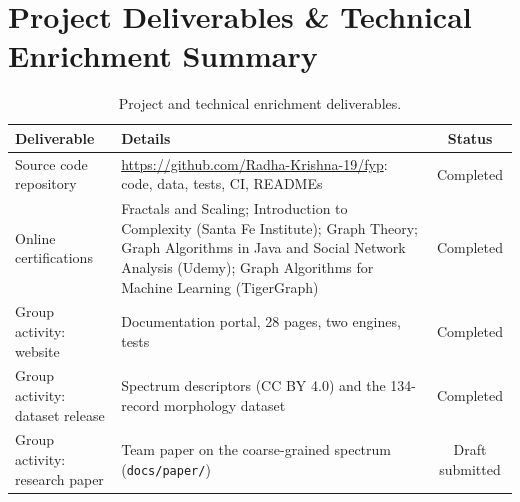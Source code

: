\documentclass[11pt, a4paper]{article}
\begin{document}
\section{Project Deliverables \& Technical Enrichment Summary}
\begin{table}[H]
    \centering
    \footnotesize
    \renewcommand{\arraystretch}{1.15}
    \begin{tabular}{|p{4.0cm}|p{9.2cm}|c|}
        \hline
        \textbf{Deliverable} & \textbf{Details} & \textbf{Status} \\
        \hline
        Source code repository & \url{https://github.com/Radha-Krishna-19/fyp}: code, data, tests, CI, READMEs & Completed \\
        \hline
        Online certifications & Fractals and Scaling; Introduction to Complexity (Santa Fe Institute); Graph Theory; Graph Algorithms in Java and Social Network Analysis (Udemy); Graph Algorithms for Machine Learning (TigerGraph) & Completed \\
        \hline
        Group activity: website & Documentation portal, 28 pages, two engines, tests & Completed \\
        \hline
        Group activity: dataset release & Spectrum descriptors (CC BY 4.0) and the 134-record morphology dataset & Completed \\
        \hline
        Group activity: research paper & Team paper on the coarse-grained spectrum (\texttt{docs/paper/}) & Draft submitted \\
        \hline
    \end{tabular}
    \caption{Project and technical enrichment deliverables.}
\end{table}

\vspace{0.1cm}
\nocite{*}
\renewcommand{\refname}{\large\bfseries\color{amritaMaroon}References}

{\footnotesize }
\end{document}
